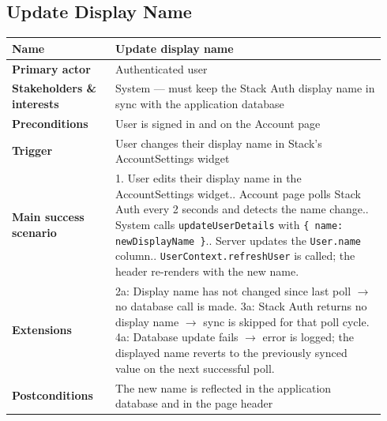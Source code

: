 \documentclass[sigconf]{acmart}
\begin{document}
\subsection*{Update Display Name}
{\footnotesize
\begin{supertabular}{@{}p{0.26\linewidth}p{0.68\linewidth}@{}}
\textbf{Name} & Update display name \\
\hline
\textbf{Primary actor} & Authenticated user \\
\hline
\textbf{Stakeholders \& interests} & System --- must keep the Stack Auth display name in sync with the application database \\
\hline
\textbf{Preconditions} & User is signed in and on the Account page \\
\hline
\textbf{Trigger} & User changes their display name in Stack's AccountSettings widget \\
\hline
\textbf{Main success scenario} & 1. User edits their display name in the AccountSettings widget.. Account page polls Stack Auth every 2 seconds and detects the name change.. System calls \texttt{updateUserDetails} with \texttt{\{ name: newDisplayName \}}.. Server updates the \texttt{User.name} column.. \texttt{UserContext.refreshUser} is called; the header re-renders with the new name. \\
\hline
\textbf{Extensions} & 2a: Display name has not changed since last poll $\rightarrow$ no database call is made.\newline
3a: Stack Auth returns no display name $\rightarrow$ sync is skipped for that poll cycle.\newline
4a: Database update fails $\rightarrow$ error is logged; the displayed name reverts to the previously synced value on the next successful poll. \\
\hline
\textbf{Postconditions} & The new name is reflected in the application database and in the page header \\
\end{supertabular}
}
\end{document}

